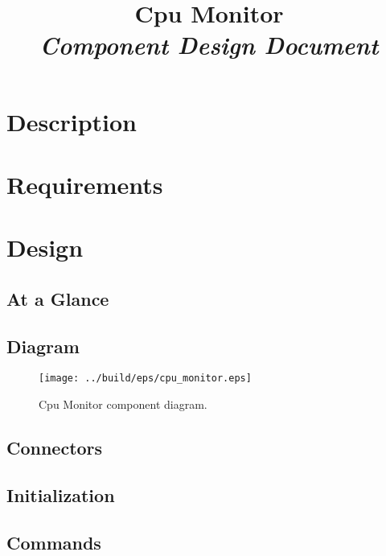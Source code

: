 



\title{\textbf{Cpu Monitor} \\
\large\textit{Component Design Document}}
\date{}
\maketitle

\section{Description}


\section{Requirements}


\section{Design}

\subsection{At a Glance}


\subsection{Diagram}
\begin{figure}[H]
  \texttt{[image: ../build/eps/cpu\_monitor.eps]}
  \caption{Cpu Monitor component diagram.}
\end{figure}

\subsection{Connectors}


\subsection{Initialization}


\subsection{Commands}

